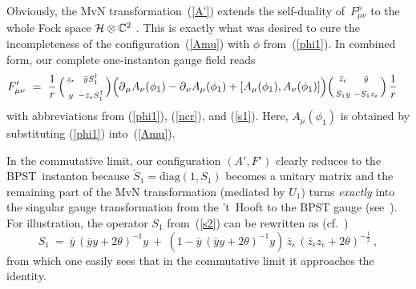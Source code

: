 \documentclass[a4paper,11pt]{article}
\numberwithin{equation}{section}
\def\eps{\epsilon}
\def\th{\theta}
\newcommand{\C}{\mathbb C}
\newcommand{\Hcal}{{\cal H}}
\def\pa{\mbox{$\partial$}}
\def\+{\dagger}
\begin{document}
{Obviously, the MvN transformation~(\ref{A'}) extends
the self-duality of~$F_{\mu\nu}^p$ to the whole Fock space 
$\Hcal\otimes\C^2$ . 
This is exactly what was desired to cure the incompleteness 
of the configuration~(\ref{Amu}) with $\phi$ from~(\ref{phi1}).
In combined form, our complete one-instanton gauge field reads
\begin{align}
F'_{\mu\nu}\ &=\
\frac{1}{r}\,
\Bigl(\begin{smallmatrix} z_\eps &  \bar y S_1^\+      \\[4pt]
                          y      & -\bar z_\eps S_1^\+ \end{smallmatrix}\Bigr)
\Bigl(\pa_\mu A_\nu (\phi_1)- \pa_\nu A_\mu (\phi_1) +
      [A_\mu (\phi_1), A_\nu (\phi_1)] \Bigr)
\Bigl(\begin{smallmatrix} \bar z_\eps & \bar y       \\[6pt]
                          S_1 y       & -S_1 z_\eps  \end{smallmatrix}\Bigr)
\,\frac{1}{r}
\end{align}
with abbreviations from (\ref{phi1}), (\ref{ncr}), and (\ref{s1}).
Here, $A_\mu (\phi_1)$ is obtained by substituting 
(\ref{phi1}) into~(\ref{Amu}).

In the commutative limit, 
our configuration $(A',F')$ clearly reduces to the BPST~instanton 
because $\check S_1=\textrm{diag}(1,S_1)$ becomes a unitary matrix 
and the remaining part of the MvN transformation (mediated by $U_1$) 
turns {\it exactly\/} into the singular gauge transformation 
from the 't~Hooft to the BPST gauge (see~\cite{Rajaraman:1982is}). 
For illustration, the operator
$S_1$ from~(\ref{s2}) can be rewritten as (cf.~\cite{Ho:2000ea})
\begin{equation}
S_1\ =\ \bar y\,(\bar y y +2\th)^{-1}y\ +\
(1 -\bar y\,(\bar y y +2\th)^{-1}y)\,\bar z_\eps\, 
(\bar z_\eps z_\eps + 2\th)^{-\frac12}\ ,
\end{equation}
from which one easily sees that in the commutative limit
it approaches the identity.

}
\end{document}

